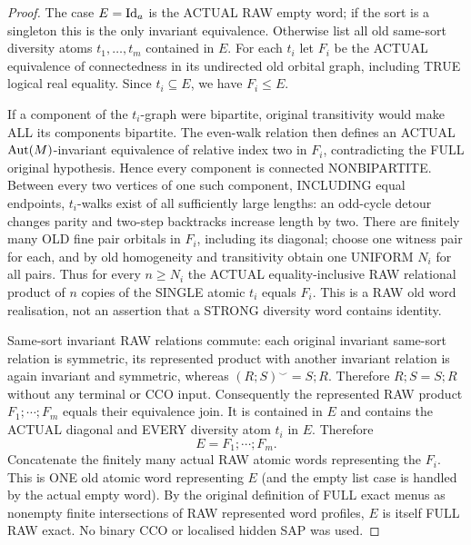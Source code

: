 \begin{proof}
The case $E=\mathrm{Id}_a$ is the ACTUAL RAW empty
word; if the sort is a singleton this is
the only invariant equivalence.
Otherwise list all old same-sort diversity
atoms $t_1,\ldots,t_m$ contained in $E$.
For each $t_i$ let $F_i$ be the ACTUAL
equivalence of connectedness in its
undirected old orbital graph, including
TRUE logical real equality. Since
$t_i\subseteq E$, we have $F_i\le E$.

If a component of the $t_i$-graph were
bipartite, original transitivity would
make ALL its components bipartite. The
even-walk relation then defines an ACTUAL
$\operatorname{Aut}(M)$-invariant equivalence of relative
index two in $F_i$, contradicting the FULL
original hypothesis. Hence every component
is connected NONBIPARTITE. Between every
two vertices of one such component,
INCLUDING equal endpoints, $t_i$-walks
exist of all sufficiently large lengths:
an odd-cycle detour changes parity and
two-step backtracks increase length by two.
There are finitely many OLD fine pair
orbitals in $F_i$, including its diagonal;
choose one witness pair for each, and by
old homogeneity and transitivity obtain
one UNIFORM $N_i$ for all pairs.
Thus for every $n\ge N_i$ the ACTUAL
equality-inclusive RAW relational product
of $n$ copies of the SINGLE atomic $t_i$
equals $F_i$. This is a RAW old word
realisation, not an assertion that a
STRONG diversity word contains identity.

Same-sort invariant RAW relations commute:
each original invariant same-sort relation is symmetric,
its represented product with another invariant relation
is again invariant and symmetric, whereas
\((R;S)^\smile=S;R\). Therefore
\(R;S=S;R\) without any terminal or CCO input.
Consequently the represented RAW product
$F_1;\cdots;F_m$ equals their equivalence
join. It is contained in $E$ and contains
the ACTUAL diagonal and EVERY diversity
atom $t_i$ in $E$. Therefore
\[
                       E=F_1;\cdots;F_m.
\]
Concatenate the finitely many actual RAW
atomic words representing the $F_i$.
This is ONE old atomic word representing
$E$ (and the empty list case is handled
by the actual empty word). By the
original definition of FULL exact menus
as nonempty finite intersections of
RAW represented word profiles, $E$
is itself FULL RAW exact. No binary
CCO or localised hidden SAP was used.
\end{proof}

